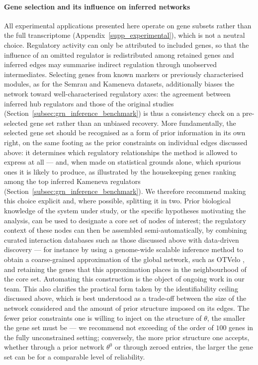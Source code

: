 \documentclass[a4paper, 11pt]{article}
\theoremstyle{plain}
\theoremstyle{remark}
\newcommand*{\firstreview}[1]{{\color{black}#1}}
\begin{document}
\firstreview{
\paragraph{Gene selection and its influence on inferred networks}
All experimental applications presented here operate on gene subsets rather than the full
transcriptome (Appendix~\ref{supp_experimental}), which is not a neutral choice. Regulatory
activity can only be attributed to included genes, so that the influence of an omitted regulator
is redistributed among retained genes and inferred edges may summarise indirect regulation
through unobserved intermediates. Selecting genes from known markers or previously characterised
modules, as for the Semrau and Kameneva datasets, additionally biases the network toward
well-characterised regulatory axes: the agreement between inferred hub regulators and those of
the original studies (Section~\ref{subsec:grn_inference_benchmark}) is thus a consistency check
on a pre-selected gene set rather than an unbiased recovery.
More fundamentally, the selected gene set should be recognised as a form of prior information in
its own right, on the same footing as the prior constraints on individual edges discussed above:
it determines which regulatory relationships the method is allowed to express at all --- and,
when made on statistical grounds alone, which spurious ones it is likely to produce, as
illustrated by the housekeeping genes ranking among the top inferred Kameneva regulators
(Section~\ref{subsec:grn_inference_benchmark}). We therefore recommend making this choice
explicit and, where possible, splitting it in two. Prior biological knowledge of the system under
study, or the specific hypotheses motivating the analysis, can be used to designate a core set of
nodes of interest; the regulatory context of these nodes can then be assembled semi-automatically,
by combining curated interaction databases such as those discussed above with data-driven
discovery --- for instance by using a genome-wide scalable inference method to obtain a
coarse-grained approximation of the global network, such as OTVelo \cite{zhao2025optimal}, and
retaining the genes that this approximation places in the neighbourhood of the core set.
Automating this construction is the object of ongoing work in our team.
This also clarifies the practical form taken by the identifiability ceiling discussed above,
which is best understood as a trade-off between the size of the network considered and the amount
of prior structure imposed on its edges. The fewer prior constraints one is willing to inject on
the structure of $\theta$, the smaller the gene set must be --- we recommend not exceeding of the
order of $100$ genes in the fully unconstrained setting; conversely, the more prior structure one accepts, whether
through a prior network $\theta^0$ or through zeroed entries,
the larger the gene set can be for a comparable level of reliability.
}
\end{document}
